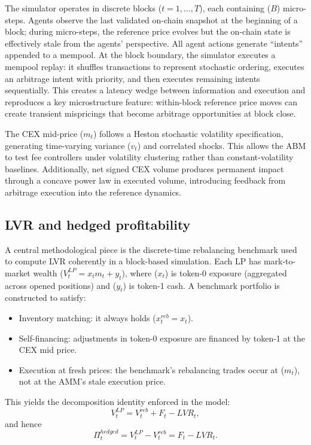 \documentclass[11pt]{article}
\begin{document}
The simulator operates in discrete blocks ($t=1,\dots,T$), each containing ($B$) micro-steps. Agents observe the last validated on-chain snapshot at 
the beginning of a block; during micro-steps, the reference price evolves but the on-chain state is effectively stale from the agents’ perspective. All 
agent actions generate “intents” appended to a mempool. At the block boundary, the simulator executes a mempool replay: it shuffles transactions to 
represent stochastic ordering, executes an arbitrage intent with priority, and then executes remaining intents sequentially. This creates a latency 
wedge between information and execution and reproduces a key microstructure feature: within-block reference price moves can create transient mispricings that 
become arbitrage opportunities at block close. 

The CEX mid-price ($m_t$) follows a Heston stochastic volatility specification, generating time-varying variance ($v_t$) and correlated shocks. This 
allows the ABM to test fee controllers under volatility clustering rather than constant-volatility baselines. Additionally, net signed CEX volume 
produces permanent impact through a concave power law in executed volume, introducing feedback from arbitrage execution into the reference dynamics. 

\subsection{LVR and hedged profitability}

A central methodological piece is the discrete-time rebalancing benchmark used to compute LVR coherently in a block-based simulation. Each LP has 
mark-to-market wealth ($V^{LP}_t = x_t m_t + y_t$), where ($x_t$) is token-0 exposure (aggregated across opened positions) and ($y_t$) is token-1 cash. 
A benchmark portfolio is constructed to satisfy:
\begin{itemize}
    \item Inventory matching: it always holds ($x^{reb}_t = x_t$).
    \item Self-financing: adjustments in token-0 exposure are financed by token-1 at the CEX mid price.
    \item Execution at fresh prices: the benchmark’s rebalancing trades occur at ($m_t$), not at the AMM’s stale execution price.
\end{itemize}

This yields the decomposition identity enforced in the model:
\begin{equation}
    V^{LP}_t = V^{reb}_t + F_t - LVR_t,
\end{equation}
and hence
\begin{equation}
\Pi^{hedged}_t = V^{LP}_t - V^{reb}_t = F_t - LVR_t.    
\end{equation}
\end{document}
